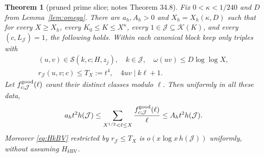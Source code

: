 \documentclass[10pt,reqno]{amsart}
\newtheorem{theorem}{Theorem}[section]
\theoremstyle{remark}
\newcommand{\K}{\mathcal K}
\newcommand{\J}{\mathcal J}
\newcommand{\Sset}{\mathcal S}
\begin{document}
\begin{theorem}[pruned prime slice; notes Theorem 34.8]\label{thm:harvest}
Fix $0<\kappa<1/240$ and $D$ from Lemma~\ref{lem:omega}.  There are
$a_h,A_h>0$ and $X_h=X_h(\kappa,D)$ such that for every $X\geq X_h$,
every $K_0\leq K\leq X^\kappa$, every $1\in\J\subseteq\K(K)$, and
 every $(c,L_{\J})=1$, the following holds.  Within each canonical block
keep only triples with
\begin{equation}\label{eq:pruning}
 \begin{gathered}
 (u,v)\in\Sset(k,c;H,z_j),\quad k\in\J,\quad
 \omega(uv)\leq D\log\log X,\\
 r_{\J}(u,v;c)\leq T_X:=t^4,\quad4uv\mid k\ell+1.
 \end{gathered}
\end{equation}
Let $f^{\rm good}_{c;\J}(\ell)$ count their distinct classes modulo $\ell$.
Then uniformly in all these data,
\begin{equation}\label{eq:harvest}
 a_ht^2h(\J)\leq\sum_{X^{1/2}<\ell\leq X}
                  \frac{f^{\rm good}_{c;\J}(\ell)}\ell
                    \leq A_ht^2h(\J).
\end{equation}
Moreover \eqref{eq:HkBV} restricted by $r_{\J}\leq T_X$ is
$o(x\log x\,h(\J))$ uniformly, without assuming $H_{k\mathrm{BV}}$.
\end{theorem}
\end{document}
